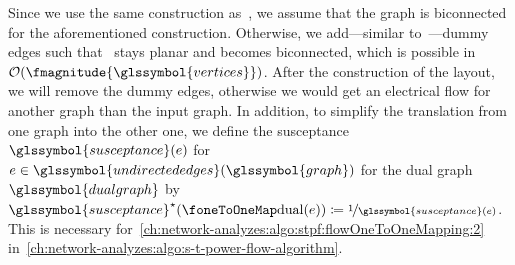 Since we use the same construction as~\textcite[pp.344ff.; Section~2]{Ros86}, we
assume that the graph is biconnected for the aforementioned construction.
Otherwise, we add---similar to~\textcite[p.345]{Ros86}---dummy edges such
that~ stays planar and becomes biconnected, which is possible
in~$\bigO(\fmagnitude{\glssymbol{vertices}})$. After the construction of the
layout, we will remove the dummy edges, otherwise we would get an electrical
flow for another graph than the input graph.
% 
In addition, to simplify the translation from one graph into the other one, we
define the susceptance~$\glssymbol{susceptance}(\edge)$
for~$\edge\in\glssymbol{undirectededges}(\glssymbol{graph})$ for the dual
graph~$\glssymbol{dualgraph}$ by~$
    \glssymbol{susceptance}^\star(\oneToOneMap(\edge))
    \coloneqq
    \nicefrac{1}{\glssymbol{susceptance}(\edge)}
$. This is necessary
for~\cref{ch:network-analyzes:algo:stpf:flowOneToOneMapping:2}
in~\cref{ch:network-analyzes:algo:s-t-power-flow-algorithm}.
%
%
